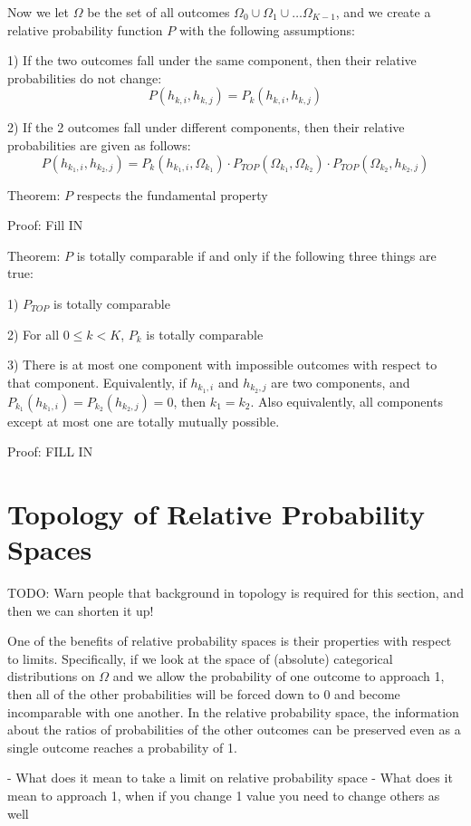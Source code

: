 \documentclass[twoside]{article}
\begin{document}
Now we let \(\Omega\) be the set of all outcomes \(\Omega_0 \cup \Omega_1 \cup \dots \Omega_{K-1}\), and we create a relative probability function \(P\) with the following assumptions:

1) If the two outcomes fall under the same component, then their relative probabilities do not change:
\[P(h_{k, i}, h_{k, j}) = P_k(h_{k, i}, h_{k, j})\]

2) If the 2 outcomes fall under different components, then their relative probabilities are given as follows:
\[P(h_{k_1, i}, h_{k_2, j}) = P_k(h_{k_1, i}, \Omega_{k_1}) \cdot  P_{TOP}(\Omega_{k_1}, \Omega_{k_2}) \cdot P_{TOP}(\Omega_{k_2}, h_{k_2, j})\]

Theorem: \(P\) respects the fundamental property

Proof: Fill IN

Theorem: \(P\) is totally comparable if and only if the following three things are true:

1) \(P_{TOP}\) is totally comparable

2) For all \(0 \leq k < K\), \(P_k\) is totally comparable

3) There is at most one component with impossible outcomes with respect to that component. Equivalently, if \(h_{k_1, i}\) and \(h_{k_2, j}\) are two components, and \(P_{k_1}(h_{k_1, i}) = P_{k_2}(h_{k_2, j}) = 0\), then \(k_1 = k_2\). Also equivalently, all components except at most one are totally mutually possible.

Proof: FILL IN



\section{Topology of Relative Probability Spaces}

TODO: Warn people that background in topology is required for this section, and then we can shorten it up!

One of the benefits of relative probability spaces is their properties with respect to limits. Specifically, if we look at the space of (absolute) categorical distributions on \(\Omega\) and we allow the probability of one outcome to approach 1, then all of the other probabilities will be forced down to 0 and become incomparable with one another. In the relative probability space, the information about the ratios of probabilities of the other outcomes can be preserved even as a single outcome reaches a probability of 1.

- What does it mean to take a limit on relative probability space
- What does it mean to approach 1, when if you change 1 value you need to change others as well
\end{document}

